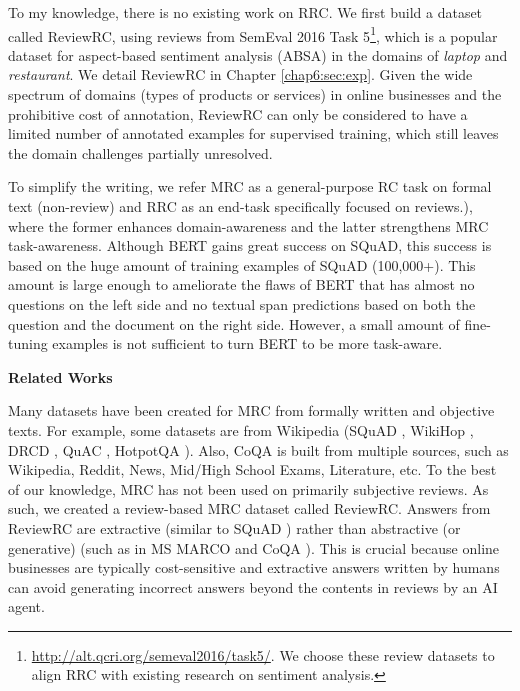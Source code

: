 To my knowledge, there is no existing work on RRC. 
We first build a dataset called ReviewRC, using reviews from SemEval 2016 Task 5\footnote{\url{http://alt.qcri.org/semeval2016/task5/}. We choose these review datasets to align RRC with existing research on sentiment analysis.}, which is a popular dataset for aspect-based sentiment analysis (ABSA) \cite{hu2004mining} in the domains of \emph{laptop} and \emph{restaurant}.
We detail ReviewRC in Chapter \ref{chap6:sec:exp}.
Given the wide spectrum of domains (types of products or services) in online businesses and the prohibitive cost of annotation, ReviewRC can only be considered to have a limited number of annotated examples for supervised training, which still leaves the domain challenges partially unresolved.

To simplify the writing, we refer MRC as a general-purpose RC task on formal text (non-review) and RRC as an end-task specifically focused on reviews.), where the former enhances domain-awareness and the latter strengthens MRC task-awareness.
Although BERT gains great success on SQuAD, this success is based on the huge amount of training examples of SQuAD (100,000+).
This amount is large enough to ameliorate the flaws of BERT that has almost no questions on the left side and no textual span predictions based on both the question and the document on the right side.
However, a small amount of fine-tuning examples is not sufficient to turn BERT to be more task-aware.

\textbf{Related Works}

Many datasets have been created for MRC from formally written and objective texts. 
For example, some datasets are from Wikipedia
(SQuAD \cite{rajpurkar2016squad,rajpurkar2018know}, WikiHop \cite{welbl2018constructing}, DRCD \cite{shao2018drcd}, QuAC \cite{choi2018quac}, HotpotQA \cite{yang2018hotpotqa}). 
Also, CoQA \cite{reddy2018coqa} is built from multiple sources, such as Wikipedia, Reddit, News, Mid/High School Exams, Literature, etc.
To the best of our knowledge, MRC has not been used on primarily subjective reviews. As such, we created a review-based MRC dataset called ReviewRC.
Answers from ReviewRC are extractive (similar to SQuAD \cite{rajpurkar2016squad,rajpurkar2018know}) rather than abstractive (or generative) (such as in MS MARCO \cite{nguyen2016ms} and CoQA \cite{reddy2018coqa}).
This is crucial because online businesses are typically cost-sensitive and extractive answers written by humans can avoid generating incorrect answers beyond the contents in reviews by an AI agent.

